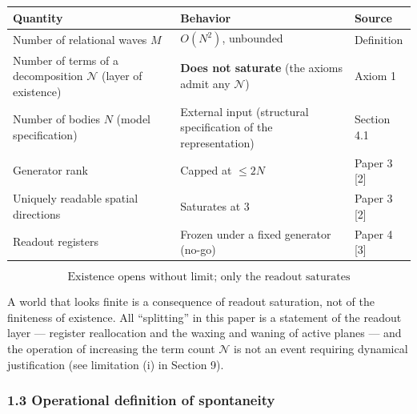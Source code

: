 \documentclass[
  a4paper,
]{article}
\newcounter{none} %
\begin{document}
{\def\LTcaptype{none} %
\begin{longtable}[]{@{}
  >{\raggedright\arraybackslash}p{}
  >{\raggedright\arraybackslash}p{}
  >{\raggedright\arraybackslash}p{}@{}}
\toprule\noalign{}
\begin{minipage}[b]{\linewidth}\raggedright
Quantity
\end{minipage} & \begin{minipage}[b]{\linewidth}\raggedright
Behavior
\end{minipage} & \begin{minipage}[b]{\linewidth}\raggedright
Source
\end{minipage} \\
\midrule\noalign{}
\endhead
\bottomrule\noalign{}
\endlastfoot
Number of relational waves \(M\) & \(O(N^2)\), unbounded & Definition \\
Number of terms of a decomposition \(\mathcal N\) (layer of existence) &
\textbf{Does not saturate} (the axioms admit any \(\mathcal N\)) & Axiom
1 \\
Number of bodies \(N\) (model specification) & External input
(structural specification of the representation) & Section 4.1 \\
Generator rank & Capped at \(\le 2N\) & Paper 3 {[}2{]} \\
Uniquely readable spatial directions & Saturates at 3 & Paper 3
{[}2{]} \\
Readout registers & Frozen under a fixed generator (no-go) & Paper 4
{[}3{]} \\
\end{longtable}
}

\[
\boxed{\ \text{Existence opens without limit; only the readout saturates}\ }
\]

A world that looks finite is a consequence of readout saturation, not of
the finiteness of existence. All ``splitting'' in this paper is a
statement of the readout layer --- register reallocation and the waxing
and waning of active planes --- and the operation of increasing the term
count \(\mathcal N\) is not an event requiring dynamical justification
(see limitation (i) in Section 9).

\subsubsection{1.3 Operational definition of
spontaneity}\label{operational-definition-of-spontaneity}
\end{document}
